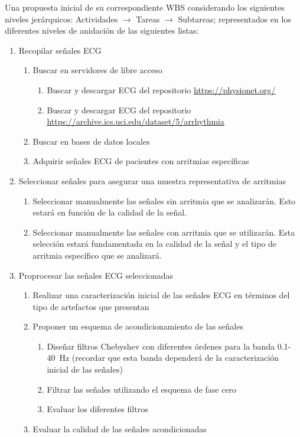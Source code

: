 \documentclass[12pt,letterpaper,spanish, twoside]{article}
\begin{document}
Una propuesta inicial de su correspondiente WBS considerando los siguientes niveles jerárquicos: Actividades $\rightarrow$ Tareas $\rightarrow$ Subtareas; representados en los diferentes niveles de anidación de las siguientes listas:
\begin{enumerate}
 \item Recopilar señales ECG
  \begin{enumerate}
   \item Buscar en servidores de libre acceso
    \begin{enumerate}
     \item Buscar y descargar ECG del repositorio \url{https://physionet.org/}
     \item Buscar y descargar ECG del repositorio \url{https://archive.ics.uci.edu/dataset/5/arrhythmia}
    \end{enumerate}
   \item Buscar en bases de datos locales
   \item Adquirir señales ECG de pacientes con arritmias específicas
  \end{enumerate}
 \item Seleccionar señales para asegurar una muestra representativa de arritmias
  \begin{enumerate}
   \item Seleccionar manualmente las señales sin arritmia que se analizarán. Esto estará en función de la calidad de la señal.
   \item Seleccionar manualmente las señales con arritmia que se utilizarán. Esta selección estará fundamentada en la calidad de la señal y el tipo de arritmia específico que se analizará.
  \end{enumerate}
 \item Proprocesar las señales ECG seleccionadas
  \begin{enumerate}
   \item Realizar una caracterización inicial de las señales ECG en términos del tipo de artefactos que presentan
   \item Proponer un esquema de acondicionamiento de las señales
    \begin{enumerate}
     \item Diseñar filtros Chebyshev con diferentes órdenes para la banda 0.1-40~Hz (recordar que esta banda dependerá de la caracterización inicial de las señales)
     \item Filtrar las señales utilizando el esquema de fase cero
     \item Evaluar los diferentes filtros
    \end{enumerate}
   \item Evaluar la calidad de las señales acondicionadas
  \end{enumerate}
\end{enumerate}
\end{document}

